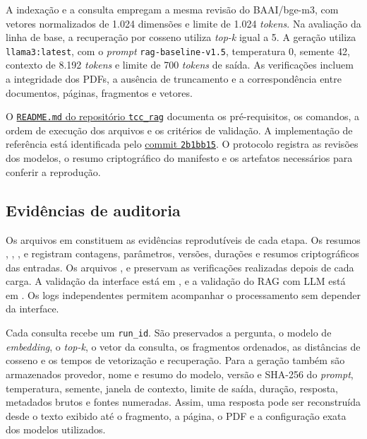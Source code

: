 A indexação e a consulta empregam a mesma revisão do BAAI/bge-m3, com vetores normalizados de 1.024 dimensões e limite de 1.024 \textit{tokens}. Na avaliação da linha de base, a recuperação por cosseno utiliza \textit{top-k} igual a 5. A geração utiliza \texttt{llama3:latest}, com o \textit{prompt} \texttt{rag-baseline-v1.5}, temperatura 0, semente 42, contexto de 8.192 \textit{tokens} e limite de 700 \textit{tokens} de saída. As verificações incluem a integridade dos PDFs, a ausência de truncamento e a correspondência entre documentos, páginas, fragmentos e vetores.

O \href{https://github.com/BrenoPiropo/tcc_rag/blob/main/README.md}{\texttt{README.md} do repositório \texttt{tcc\_rag}} documenta os pré-requisitos, os comandos, a ordem de execução dos arquivos e os critérios de validação. A implementação de referência está identificada pelo \href{https://github.com/BrenoPiropo/tcc_rag/tree/2b1bb15cd4d6d9fb433c50de21f32d0dc04f6e6d}{commit \texttt{2b1bb15}}. O protocolo registra as revisões dos modelos, o resumo criptográfico do manifesto e os artefatos necessários para conferir a reprodução.

\subsection{Evidências de auditoria}

Os arquivos em  constituem as evidências reprodutíveis de cada etapa. Os resumos , , ,  e  registram contagens, parâmetros, versões, durações e resumos criptográficos das entradas. Os arquivos ,  e  preservam as verificações realizadas depois de cada carga. A validação da interface está em , e a validação do RAG com LLM está em . Os logs independentes permitem acompanhar o processamento sem depender da interface.

Cada consulta recebe um \texttt{run\_id}. São preservados a pergunta, o modelo de \textit{embedding}, o \textit{top-k}, o vetor da consulta, os fragmentos ordenados, as distâncias de cosseno e os tempos de vetorização e recuperação. Para a geração também são armazenados provedor, nome e resumo do modelo, versão e SHA-256 do \textit{prompt}, temperatura, semente, janela de contexto, limite de saída, duração, resposta, metadados brutos e fontes numeradas. Assim, uma resposta pode ser reconstruída desde o texto exibido até o fragmento, a página, o PDF e a configuração exata dos modelos utilizados.

